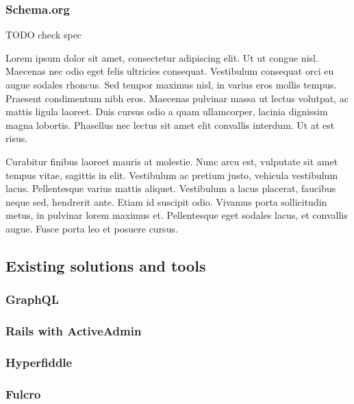 \subsubsection{Schema.org}

TODO check spec

Lorem ipsum dolor sit amet, consectetur adipiscing elit. Ut ut congue nisl. Maecenas nec odio eget felis ultricies consequat. Vestibulum consequat orci eu augue sodales rhoncus. Sed tempor maximus nisl, in varius eros mollis tempus. Praesent condimentum nibh eros. Maecenas pulvinar massa ut lectus volutpat, ac mattis ligula laoreet. Duis cursus odio a quam ullamcorper, lacinia dignissim magna lobortis. Phasellus nec lectus sit amet elit convallis interdum. Ut at est risus.

Curabitur finibus laoreet mauris at molestie. Nunc arcu est, vulputate sit amet tempus vitae, sagittis in elit. Vestibulum ac pretium justo, vehicula vestibulum lacus. Pellentesque varius mattis aliquet. Vestibulum a lacus placerat, faucibus neque sed, hendrerit ante. Etiam id suscipit odio. Vivamus porta sollicitudin metus, in pulvinar lorem maximus et. Pellentesque eget sodales lacus, et convallis augue. Fusce porta leo et posuere cursus.

\subsection{Existing solutions and tools}

\subsubsection{GraphQL}
\subsubsection{Rails with ActiveAdmin}
\subsubsection{Hyperfiddle}
\subsubsection{Fulcro}
